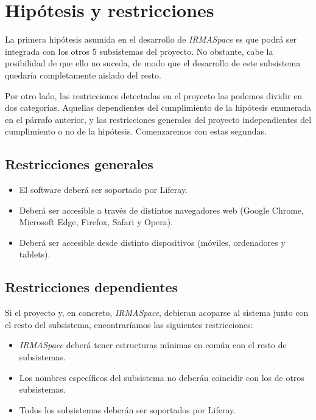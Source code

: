 \section{Hipótesis y restricciones}\label{sec:constaints}

\par La primera hipótesis asumida en el desarrollo de \textit{IRMASpace} es que podrá ser integrada con los otros 5 subsistemas del proyecto. No obstante, cabe la posibilidad de que ello no suceda, de modo que el desarrollo de este subsistema quedaría completamente aislado del resto.

\par Por otro lado, las restricciones detectadas en el proyecto las podemos dividir en dos categorías. Aquellas dependientes del cumplimiento de la hipótesis enumerada en el párrafo anterior, y las restricciones generales del proyecto independientes del cumplimiento o no de la hipótesis. Comenzaremos con estas segundas.

\subsection{Restricciones generales}
\begin{itemize}
    \item El software deberá ser soportado por Liferay.
    \item Deberá ser accesible a través de distintos navegadores web (Google Chrome, Microsoft Edge, Firefox, Safari y Opera).
    \item Deberá ser accesible desde distinto dispositivos (móviles, ordenadores y tablets).
\end{itemize}

\subsection{Restricciones dependientes}
\par Si el proyecto y, en concreto, \textit{IRMASpace}, debieran acoparse al sistema junto con el resto del subsistema, encontraríamos las siguientes restricciones:
\begin{itemize}
    \item \textit{IRMASpace} deberá tener estructuras mínimas en común con el resto de subsistemas.
    \item Los nombres específicos del subsistema no deberán coincidir con los de otros subsistemas.
    \item Todos los subsistemas deberán ser soportados por Liferay.
\end{itemize}
